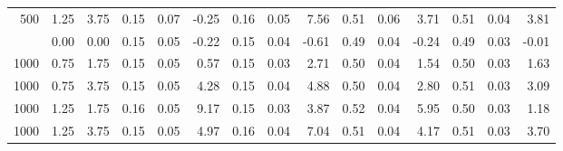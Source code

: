 \documentclass[10,a4paperpaper,]{article}
\begin{document}
\begin{table}
{\begin{tabular}[t]{rrrrrrrrrrrrrrr}
500 & 1.25 & 3.75 & 0.15 & 0.07 & -0.25 & 0.16 & 0.05 & 7.56 & 0.51 & 0.06 & 3.71 & 0.51 & 0.04 & 3.81\\
\addlinespace
1000 & 0.00 & 0.00 & 0.15 & 0.05 & -0.22 & 0.15 & 0.04 & -0.61 & 0.49 & 0.04 & -0.24 & 0.49 & 0.03 & -0.01\\
1000 & 0.75 & 1.75 & 0.15 & 0.05 & 0.57 & 0.15 & 0.03 & 2.71 & 0.50 & 0.04 & 1.54 & 0.50 & 0.03 & 1.63\\
1000 & 0.75 & 3.75 & 0.15 & 0.05 & 4.28 & 0.15 & 0.04 & 4.88 & 0.50 & 0.04 & 2.80 & 0.51 & 0.03 & 3.09\\
1000 & 1.25 & 1.75 & 0.16 & 0.05 & 9.17 & 0.15 & 0.03 & 3.87 & 0.52 & 0.04 & 5.95 & 0.50 & 0.03 & 1.18\\
1000 & 1.25 & 3.75 & 0.15 & 0.05 & 4.97 & 0.16 & 0.04 & 7.04 & 0.51 & 0.04 & 4.17 & 0.51 & 0.03 & 3.70\\
\bottomrule
\end{tabular}}
\end{table}
\end{document}
